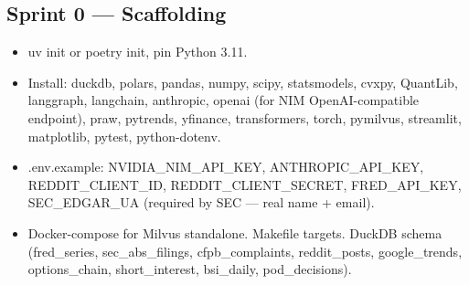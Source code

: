 \documentclass[11pt]{article}
\newcommand{\inlinecode}[1]{{\ttfamily\small #1}}
\begin{document}
\subsection{Sprint 0 --- Scaffolding}
\begin{itemize}
  \item \inlinecode{uv init} or \inlinecode{poetry init}, pin Python 3.11.
  \item Install: \inlinecode{duckdb}, \inlinecode{polars}, \inlinecode{pandas}, \inlinecode{numpy}, \inlinecode{scipy}, \inlinecode{statsmodels}, \inlinecode{cvxpy}, \inlinecode{QuantLib}, \inlinecode{langgraph}, \inlinecode{langchain}, \inlinecode{anthropic}, \inlinecode{openai} (for NIM OpenAI-compatible endpoint), \inlinecode{praw}, \inlinecode{pytrends}, \inlinecode{yfinance}, \inlinecode{transformers}, \inlinecode{torch}, \inlinecode{pymilvus}, \inlinecode{streamlit}, \inlinecode{matplotlib}, \inlinecode{pytest}, \inlinecode{python-dotenv}.
  \item \inlinecode{.env.example}: \inlinecode{NVIDIA\_NIM\_API\_KEY}, \inlinecode{ANTHROPIC\_API\_KEY}, \inlinecode{REDDIT\_CLIENT\_ID}, \inlinecode{REDDIT\_CLIENT\_SECRET}, \inlinecode{FRED\_API\_KEY}, \inlinecode{SEC\_EDGAR\_UA} (required by SEC --- real name + email).
  \item Docker-compose for Milvus standalone. Makefile targets. DuckDB schema (\inlinecode{fred\_series}, \inlinecode{sec\_abs\_filings}, \inlinecode{cfpb\_complaints}, \inlinecode{reddit\_posts}, \inlinecode{google\_trends}, \inlinecode{options\_chain}, \inlinecode{short\_interest}, \inlinecode{bsi\_daily}, \inlinecode{pod\_decisions}).
\end{itemize}
\end{document}
